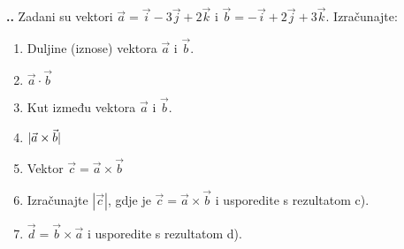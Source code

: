 \noindent 
\textbf{
\thecjelina.\thezadatak.}
Zadani su vektori $\vec{a}=\vec{i}-3\vec{j}+2\vec{k} $ 
i $\vec{b}= -\vec{i}+ 2\vec{j}+3\vec{k}  $. Izračunajte:
\begin{enumerate}[label=\alph*)]
 \item Duljine (iznose) vektora $\vec{a}$ i $\vec{b}$.
 \item $\vec{a} \cdot \vec{b}  $
 \item Kut između vektora $\vec{a}$ i $\vec{b}$.
 \item $\arrowvert \vec{a} \times \vec{b}  \arrowvert$ 
 \item Vektor $\vec{c}= \vec{a} \times \vec{b}  $ 
 \item Izračunajte $ | \vec{c} |$, gdje je $\vec{c}=\vec{a} \times \vec{b}$ i usporedite s rezultatom c).
 \item $\vec{d}=\vec{b}\times\vec{a}$ i usporedite s rezultatom d).
\end{enumerate}
